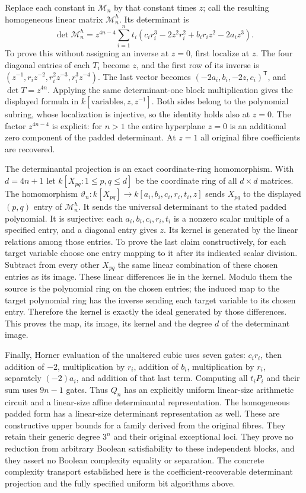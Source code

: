Replace each constant in $\mathcal M_n$ by that constant times $z$;
call the resulting homogeneous linear matrix $\mathcal M_n^h$.
Its determinant is
\[
 \det\mathcal M_n^h
 =z^{4n-4}\sum_{i=1}^n t_i
   (c_ir_i^3-2z^2r_i^2+b_ir_iz^2-2a_iz^3).
\]
To prove this without assigning an inverse at $z=0$, first localize at
$z$. The four diagonal entries of each $T_i$ become $z$, and the first
row of its inverse is $(z^{-1},r_iz^{-2},r_i^2z^{-3},r_i^3z^{-4})$.
The last vector becomes $(-2a_i,b_i,-2z,c_i)^{\mathsf T}$, and
$\det T=z^{4n}$. Applying the same determinant-one block multiplication
gives the displayed formula in $k[\text{variables},z,z^{-1}]$.
Both sides belong to the polynomial subring, whose localization is
injective, so the identity holds also at $z=0$. The factor
$z^{4n-4}$ is explicit: for $n>1$ the entire hyperplane $z=0$ is an
additional zero component of the padded determinant. At $z=1$ all
original fibre coefficients are recovered.

The determinantal projection is an exact coordinate-ring homomorphism.
With $d=4n+1$ let $k[X_{pq}:1\le p,q\le d]$ be the coordinate ring
of all $d\times d$ matrices. The homomorphism
$\vartheta_n:k[X_{pq}]\to k[a_i,b_i,c_i,r_i,t_i,z]$ sends
$X_{pq}$ to the displayed $(p,q)$ entry of $\mathcal M_n^h$.
It sends the universal determinant to the stated padded polynomial.
It is surjective: each $a_i,b_i,c_i,r_i,t_i$ is a nonzero scalar
multiple of a specified entry, and a diagonal entry gives $z$.
Its kernel is generated by the linear relations among those entries.
To prove the last claim constructively, for each target variable choose
one entry mapping to it after its indicated scalar division. Subtract
from every other $X_{pq}$ the same linear combination of these chosen
entries as its image. These linear differences lie in the kernel.
Modulo them the source is the polynomial ring on the chosen entries;
the induced map to the target polynomial ring has the inverse sending
each target variable to its chosen entry. Therefore the kernel is
exactly the ideal generated by those differences. This proves the map,
its image, its kernel and the degree $d$ of the determinant image.

Finally, Horner evaluation of the unaltered cubic uses seven gates:
$c_ir_i$, then addition of $-2$, multiplication by $r_i$, addition of
$b_i$, multiplication by $r_i$, separately $(-2)a_i$, and addition of
that last term. Computing all $t_iP_i$ and their sum uses $9n-1$ gates.
Thus $Q_n$ has an explicitly uniform linear-size arithmetic circuit and
a linear-size affine determinantal representation. The homogeneous padded
form has a linear-size determinant representation as well. These are
constructive upper bounds for a family derived from the original fibres.
They retain their generic degree $3^n$ and their original exceptional
loci. They prove no reduction from arbitrary Boolean satisfiability to
these independent blocks, and they assert no Boolean complexity equality
or separation. The concrete complexity transport established here is
the coefficient-recoverable determinant projection and the fully specified
uniform bit algorithms above.

